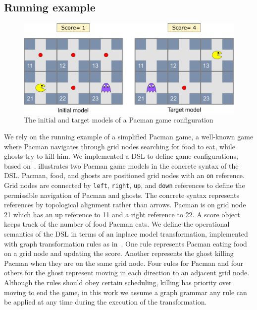 \subsection{Running example}\label{sec:example}

\begin{figure}
    \centering
    \includegraphics[width=.8\linewidth]{images/pacman_example}
    \caption{The initial and target models of a Pacman game configuration}
    \label{fig:example}
\end{figure}
%
We rely on the running example of a simplified Pacman game, a well-known game where Pacman navigates through grid nodes searching for food to eat, while ghosts try to kill him.
We implemented a DSL to define game configurations, based on~\cite{Syriani2013a}.
 illustrates two Pacman game models in the concrete syntax of the DSL.
Pacman, food, and ghosts are positioned grid nodes with an \texttt{on} reference.
Grid nodes are connected by \texttt{left}, \texttt{right}, \texttt{up}, and \texttt{down} references to define the permissible navigation of Pacman and ghosts.
The concrete syntax represents references by topological alignment rather than arrows.
Pacman is on grid node 21 which has an up reference to 11 and a right reference to 22.
A score object keeps track of the number of food Pacman eats.
We define the operational semantics of the DSL in terms of an inplace model transformation, implemented with graph transformation rules as in~\cite{Syriani2013a}.
One rule represents Pacman eating food on a grid node and updating the score.
Another represents the ghost killing Pacman when they are on the same grid node.
Four rules for Pacman and four others for the ghost represent moving in each direction to an adjacent grid node.
Although the rules should obey certain scheduling, \eg killing has priority over moving to end the game, in this work we assume a graph grammar \ie any rule can be applied at any time during the execution of the transformation.

